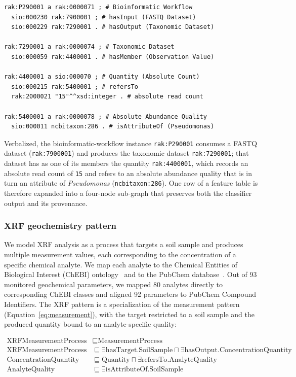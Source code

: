 \documentclass[11pt,a4paper]{article}
\begin{document}
\begin{lstlisting}[caption={Turtle representation of taxonomic
  abundance formalized from a feature table.},
  label={lst:ttl_tax}, basicstyle=\ttfamily\scriptsize, frame=single]
rak:P290001 a rak:0000071 ; # Bioinformatic Workflow
  sio:000230 rak:7900001 ; # hasInput (FASTQ Dataset)
  sio:000229 rak:7290001 . # hasOutput (Taxonomic Dataset)

rak:7290001 a rak:0000074 ; # Taxonomic Dataset
  sio:000059 rak:4400001 . # hasMember (Observation Value)

rak:4400001 a sio:000070 ; # Quantity (Absolute Count)
  sio:000215 rak:5400001 ; # refersTo
  rak:2000021 "15"^^xsd:integer . # absolute read count

rak:5400001 a rak:0000078 ; # Absolute Abundance Quality
  sio:000011 ncbitaxon:286 . # isAttributeOf (Pseudomonas)
\end{lstlisting}

Verbalized, the bioinformatic-workflow instance \texttt{rak:P290001}
consumes a FASTQ dataset (\texttt{rak:7900001}) and produces the
taxonomic dataset \texttt{rak:7290001}; that dataset has as one of its
members the quantity \texttt{rak:4400001}, which records an absolute
read count of \texttt{15} and refers to an absolute abundance quality
that is in turn an attribute of \emph{Pseudomonas}
(\texttt{ncbitaxon:286}). One row of a feature table is therefore
expanded into a four-node sub-graph that preserves both the classifier
output and its provenance.

\subsubsection{XRF geochemistry pattern}

We model XRF analysis as a process that targets a soil sample and
produces multiple measurement values, each corresponding to the
concentration of a specific chemical analyte. We map each analyte to
the Chemical Entities of Biological Interest (ChEBI)
ontology~\cite{chebi} and to the PubChem database~\cite{pubchem}. Out
of 93 monitored geochemical parameters, we mapped 80 analytes directly
to corresponding ChEBI classes and aligned 92 parameters to PubChem
Compound Identifiers. The XRF pattern is a specialization of the
measurement pattern (Equation~\ref{eq:measurement}), with the target
restricted to a soil sample and the produced quantity bound to an
analyte-specific quality:

\begin{align}
    \label{eq:xrf}
    \text{XRFMeasurementProcess} & \sqsubseteq \text{MeasurementProcess} \\
    \text{XRFMeasurementProcess} & \sqsubseteq \exists
        \text{hasTarget}.\text{SoilSample} \sqcap \exists
        \text{hasOutput}.\text{ConcentrationQuantity} \\
    \text{ConcentrationQuantity} & \sqsubseteq \text{Quantity} \sqcap
        \exists \text{refersTo}.\text{AnalyteQuality} \\
    \text{AnalyteQuality} & \sqsubseteq \exists
        \text{isAttributeOf}.\text{SoilSample}
\end{align}
\end{document}
